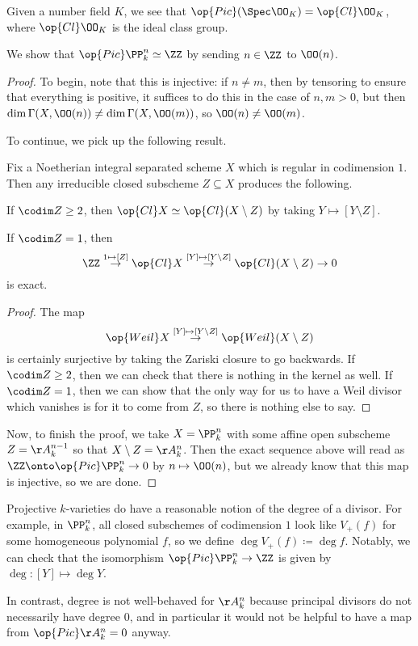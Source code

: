 \documentclass[../notes.tex]{subfiles}
\begin{document}
\begin{example}
	Given a number field $K$, we see that $\op{Pic}(\Spec\OO_K)=\op{Cl}\OO_K$, where $\op{Cl}\OO_K$ is the ideal class group.
\end{example}
\begin{exe}
	We show that $\op{Pic}\PP^n_k\simeq\ZZ$ by sending $n\in\ZZ$ to $\OO(n)$.
\end{exe}
\begin{proof}
	To begin, note that this is injective: if $n\ne m$, then by tensoring to ensure that everything is positive, it suffices to do this in the case of $n,m>0$, but then $\dim\Gamma(X,\OO(n))\ne\dim\Gamma(X,\OO(m))$, so $\OO(n)\ne\OO(m)$.

	To continue, we pick up the following result.
	\begin{proposition}
		Fix a Noetherian integral separated scheme $X$ which is regular in codimension $1$. Then any irreducible closed subscheme $Z\subseteq X$ produces the following.
		\begin{listalph}
			\item If $\codim Z\ge2$, then $\op{Cl}X\simeq\op{Cl}(X\setminus Z)$ by taking $Y\mapsto[Y\setminus Z]$.
			\item If $\codim Z=1$, then
			\[\ZZ\stackrel{1\mapsto[Z]}\to\op{Cl}X\stackrel{[Y]\mapsto[Y\setminus Z]}\to\op{Cl}(X\setminus Z)\to0\]
			is exact.
		\end{listalph}
	\end{proposition}
	\begin{proof}
		The map
		\[\op{Weil}X\stackrel{[Y]\mapsto[Y\setminus Z]}\to\op{Weil}(X\setminus Z)\]
		is certainly surjective by taking the Zariski closure to go backwards. If $\codim Z\ge2$, then we can check that there is nothing in the kernel as well. If $\codim Z=1$, then we can show that the only way for us to have a Weil divisor which vanishes is for it to come from $Z$, so there is nothing else to say.
	\end{proof}
	Now, to finish the proof, we take $X=\PP^n_k$ with some affine open subscheme $Z=\AA^{n-1}_k$ so that $X\setminus Z=\AA^n_k$. Then the exact sequence above will read as $\ZZ\onto\op{Pic}\PP^n_k\to0$ by $n\mapsto\OO(n)$, but we already know that this map is injective, so we are done.
\end{proof}
\begin{remark}
	Projective $k$-varieties do have a reasonable notion of the degree of a divisor. For example, in $\PP^n_k$, all closed subschemes of codimension $1$ look like $V_+(f)$ for some homogeneous polynomial $f$, so we define $\deg V_+(f)\coloneqq\deg f$. Notably, we can check that the isomorphism $\op{Pic}\PP^n_k\to\ZZ$ is given by $\deg\colon[Y]\mapsto\deg Y$.
\end{remark}
\begin{remark}
	In contrast, degree is not well-behaved for $\AA^n_k$ because principal divisors do not necessarily have degree $0$, and in particular it would not be helpful to have a map from $\op{Pic}\AA^n_k=0$ anyway.
\end{remark}
\end{document}
